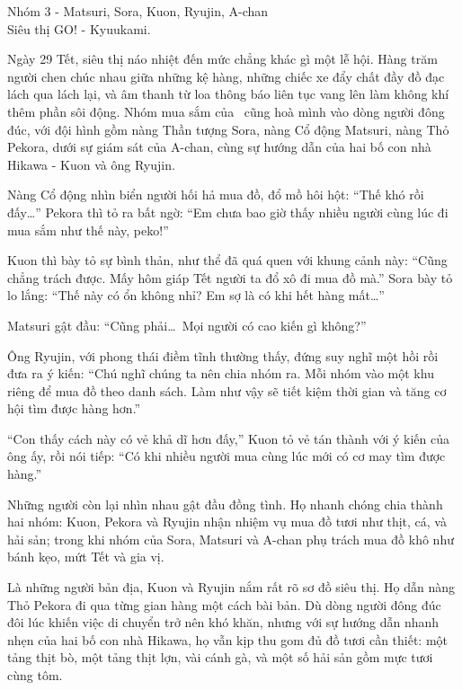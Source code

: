 \documentclass[../main.tex]{subfiles}
\begin{document}
\begin{center}
    {\color{T3} Nhóm 3 - Matsuri, Sora, Kuon, Ryujin, A-chan}\\Siêu thị GO! - Kyuukami.
\end{center}

Ngày 29 Tết, siêu thị náo nhiệt đến mức chẳng khác gì một lễ hội. Hàng trăm người chen chúc nhau giữa những kệ hàng, những chiếc xe đẩy chất đầy đồ đạc lách qua lách lại, và âm thanh từ loa thông báo liên tục vang lên làm không khí thêm phần sôi động. Nhóm mua sắm của \hll\ cũng hoà mình vào dòng người đông đúc, với đội hình gồm nàng Thần tượng Sora, nàng Cổ động Matsuri, nàng Thỏ Pekora, dưới sự giám sát của A-chan, cùng sự hướng dẫn của hai bố con nhà Hikawa - Kuon và ông Ryujin.

Nàng Cổ động nhìn biển người hối hả mua đồ, đổ mồ hôi hột: ``Thế khó rồi đấy\dots'' Pekora thì tỏ ra bất ngờ: ``Em chưa bao giờ thấy nhiều người cùng lúc đi mua sắm như thế này, peko!''

Kuon thì bày tỏ sự bình thản, như thể đã quá quen với khung cảnh này: ``Cũng chẳng trách được. Mấy hôm giáp Tết người ta đổ xô đi mua đồ mà.'' Sora bày tỏ lo lắng: ``Thế này có ổn không nhỉ? Em sợ là có khi hết hàng mất\dots''

Matsuri gật đầu: ``Cũng phải\dots\ Mọi người có cao kiến gì không?''

Ông Ryujin, với phong thái điềm tĩnh thường thấy, đứng suy nghĩ một hồi rồi đưa ra ý kiến: ``Chú nghĩ chúng ta nên chia nhóm ra. Mỗi nhóm vào một khu riêng để mua đồ theo danh sách. Làm như vậy sẽ tiết kiệm thời gian và tăng cơ hội tìm được hàng hơn.''

``Con thấy cách này có vẻ khả dĩ hơn đấy,'' Kuon tỏ vẻ tán thành với ý kiến của ông ấy, rồi nói tiếp: ``Có khi nhiều người mua cùng lúc mới có cơ may tìm được hàng.''

Những người còn lại nhìn nhau gật đầu đồng tình. Họ nhanh chóng chia thành hai nhóm: Kuon, Pekora và Ryujin nhận nhiệm vụ mua đồ tươi như thịt, cá, và hải sản; trong khi nhóm của Sora, Matsuri và A-chan phụ trách mua đồ khô như bánh kẹo, mứt Tết và gia vị.

\ct

Là những người bản địa, Kuon và Ryujin nắm rất rõ sơ đồ siêu thị. Họ dẫn nàng Thỏ Pekora đi qua từng gian hàng một cách bài bản. Dù dòng người đông đúc đôi lúc khiến việc di chuyển trở nên khó khăn, nhưng với sự hướng dẫn nhanh nhẹn của hai bố con nhà Hikawa, họ vẫn kịp thu gom đủ đồ tươi cần thiết: một tảng thịt bò, một tảng thịt lợn, vài cánh gà, và một số hải sản gồm mực tươi cùng tôm.
\end{document}
